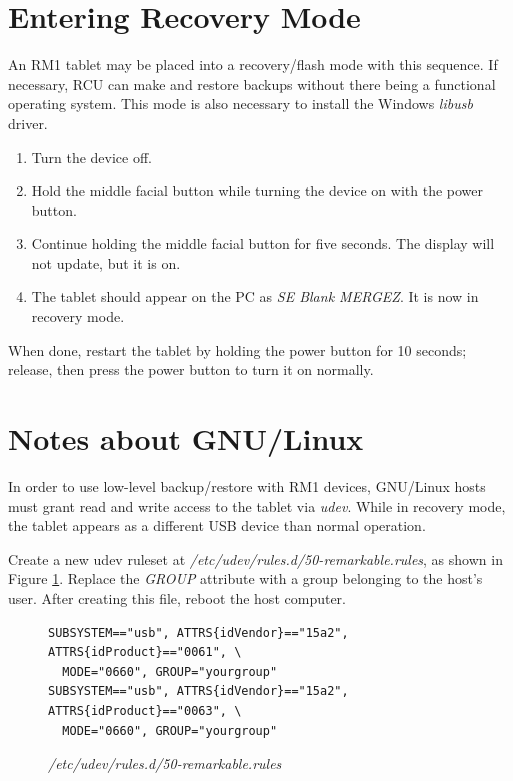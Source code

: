 \documentclass{memoir}
\begin{document}
{\newpage
\section{Entering Recovery Mode}
\label{sec:enteringrecoverymode}
An RM1 tablet may be placed into a recovery/flash mode with this sequence. If necessary, RCU can make and restore backups without there being a functional operating system. This mode is also necessary to install the Windows \textit{libusb} driver.

\begin{enumerate}
\item{Turn the device off.}
\item{Hold the middle facial button while turning the device on with the power button.}
\item{Continue holding the middle facial button for five seconds. The display will not update, but it is on.}
\item{The tablet should appear on the PC as \textit{SE Blank MERGEZ}. It is now in recovery mode.}
\end{enumerate}

When done, restart the tablet by holding the power button for 10 seconds; release, then press the power button to turn it on normally.


\section{Notes about GNU/Linux}
\label{sec:linnotes}
In order to use low-level backup/restore with RM1 devices, GNU/Linux hosts must grant read and write access to the tablet via \textit{udev}. While in recovery mode, the tablet appears as a different USB device than normal operation.

Create a new udev ruleset at \textit{/etc/udev/rules.d/50-remarkable.rules}, as shown in Figure \ref{fig:udevrules}. Replace the \textit{GROUP} attribute with a group belonging to the host's user. After creating this file, reboot the host computer.

\begin{figure}[h]
\begin{verbatim}
SUBSYSTEM=="usb", ATTRS{idVendor}=="15a2", ATTRS{idProduct}=="0061", \
  MODE="0660", GROUP="yourgroup"
SUBSYSTEM=="usb", ATTRS{idVendor}=="15a2", ATTRS{idProduct}=="0063", \
  MODE="0660", GROUP="yourgroup"
\end{verbatim}
\caption{\textit{/etc/udev/rules.d/50-remarkable.rules}}
\label{fig:udevrules}
\end{figure}

}
\end{document}
